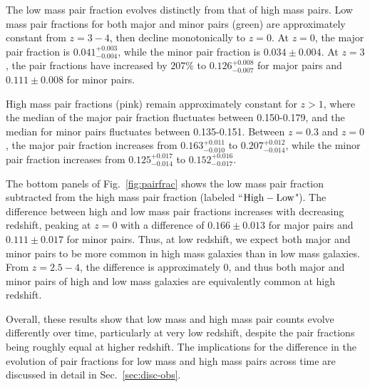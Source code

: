 \documentclass[twocolumn]{aastex631}
\begin{document}
    The low mass pair fraction evolves distinctly from that of high mass pairs.
    Low mass pair fractions for both major and minor pairs (green) are approximately constant from $z=3-4$, then decline monotonically to $z=0$. At $z=0$, the major pair fraction is $0.041^{+0.003}_{-0.004}$, while the minor pair fraction is $0.034\pm0.004$.
    At $z=3$, the pair fractions have increased by $207\%$ to $0.126^{+0.008}_{-0.007}$ for major pairs and $0.111\pm0.008$ for minor pairs. 

    High mass pair fractions (pink) remain approximately constant for $z>1$, where the median of the major pair fraction fluctuates between 0.150-0.179, and the median for minor pairs fluctuates between 0.135-0.151.
    Between $z=0.3$ and $z=0$, the major pair fraction increases from $0.163^{+0.011}_{-0.010}$ to $0.207^{+0.012}_{-0.014}$, while the minor pair fraction increases from $0.125^{+0.017}_{-0.014}$ to $0.152^{+0.016}_{-0.017}$.
    
    The bottom panels of Fig.~\ref{fig:pairfrac} shows the low mass pair fraction subtracted from the high mass pair fraction (labeled ``$\rm High-Low$").
    The difference between high and low mass pair fractions increases with decreasing redshift, peaking at $z=0$ with a difference of $0.166\pm0.013$ for major pairs and $0.111\pm0.017$ for minor pairs. 
    Thus, at low redshift, we expect both major and minor pairs to be more common in high mass galaxies than in low mass galaxies. 
    From $z=2.5-4$, the difference is approximately 0, and thus both major and minor pairs of high and low mass galaxies are equivalently common at high redshift. 
    
    Overall, these results show that low mass and high mass pair counts evolve differently over time, particularly at very low redshift, despite the pair fractions being roughly equal at higher redshift. 
    The implications for the difference in the evolution of pair fractions for low mass and high mass pairs across time are discussed in detail in Sec.~\ref{sec:disc-obs}.
    
\end{document}
